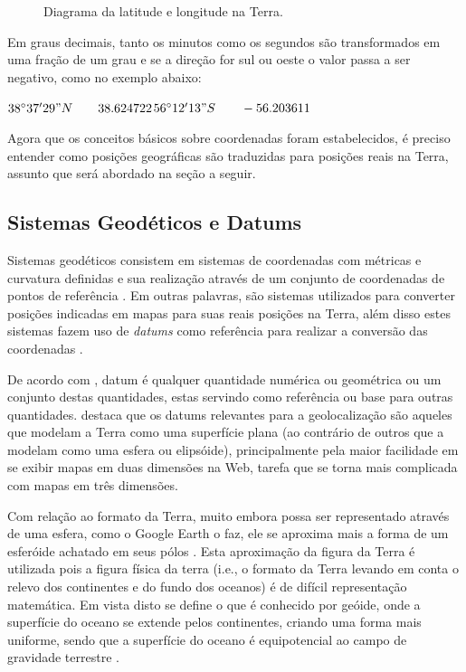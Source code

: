 \documentclass[diss]{template/setrem}
\begin{document}
\begin{figure}[!h]
    \caption{Diagrama da latitude e longitude na Terra.}
    \label{fig:latlng}
\end{figure}

Em graus decimais, tanto os minutos como os segundos são transformados em uma fração de um grau e se a direção for sul ou oeste o valor passa a ser negativo, como no exemplo abaixo:


	$38^{\circ}37'29"N \qquad 38.624722$\hfill$56^{\circ}12'13"S \qquad -56.203611$
	
Agora que os conceitos básicos sobre coordenadas foram estabelecidos, é preciso entender como posições geográficas são traduzidas para posições reais na Terra, assunto que será abordado na seção a seguir.

\subsection{Sistemas Geodéticos e Datums}
\label{subsec:sistgeodatum}
Sistemas geodéticos consistem em sistemas de coordenadas com métricas e curvatura definidas e sua realização através de um conjunto de coordenadas de pontos de referência \citep{Torge1991}. Em outras palavras, são sistemas utilizados para converter posições indicadas em mapas para suas reais posições na Terra, além disso estes sistemas fazem uso de \emph{datums} como referência para realizar a conversão das coordenadas \citep{Holdener2011}.

De acordo com \citet{DefenseMappingAgency1983}, datum é qualquer quantidade numérica ou geométrica ou um conjunto destas quantidades, estas servindo como referência ou base para outras quantidades. \citet{Holdener2011} destaca que os datums relevantes para a geolocalização são aqueles que modelam a Terra como uma superfície plana (ao contrário de outros que a modelam como uma esfera ou elipsóide), principalmente pela maior facilidade em se exibir mapas em duas dimensões na Web, tarefa que se torna mais complicada com mapas em três dimensões.

Com relação ao formato da Terra, muito embora possa ser representado através de uma esfera, como o Google Earth o faz, ele se aproxima mais a forma de um esferóide achatado em seus pólos \citep{Holdener2011}. Esta aproximação da figura da Terra é utilizada pois a figura física da terra (i.e., o formato da Terra levando em conta o relevo dos continentes e do fundo dos oceanos) é de difícil representação matemática. Em vista disto se define o que é conhecido por geóide, onde a superfície do oceano se extende pelos continentes, criando uma forma mais uniforme, sendo que a superfície do oceano é equipotencial ao campo de gravidade terrestre \citep{Torge1991}.
\end{document}
